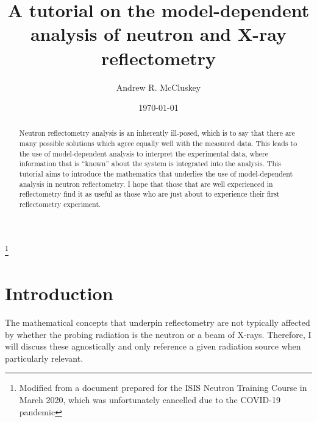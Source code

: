 \documentclass[
 reprint,
 superscriptaddress,
 amsmath,amssymb,
 aps,
]{revtex4-1}
\begin{document}
\title{A tutorial on the model-dependent analysis of neutron and X-ray reflectometry}%
\thanks{Modified from a document prepared for the ISIS Neutron Training Course in March 2020, which was unfortunately cancelled due to the COVID-19 pandemic}%

\author{Andrew R. McCluskey}



\date{\today}%

\begin{abstract}
Neutron reflectometry analysis is an inherently ill-posed, which is to say that there are many possible solutions which agree equally well with the measured data. 
This leads to the use of model-dependent analysis to interpret the experimental data, where information that is ``known'' about the system is integrated into the analysis.
This tutorial aims to introduce the mathematics that underlies the use of model-dependent analysis in neutron reflectometry. 
I hope that those that are well experienced in reflectometry find it as useful as those who are just about to experience their first reflectometry experiment. 
\end{abstract}

\maketitle


\section{Introduction}
The mathematical concepts that underpin reflectometry are not typically affected by whether the probing radiation is the neutron or a beam of X-rays. 
Therefore, I will discuss these agnostically and only reference a given radiation source when particularly relevant.
\end{document}
